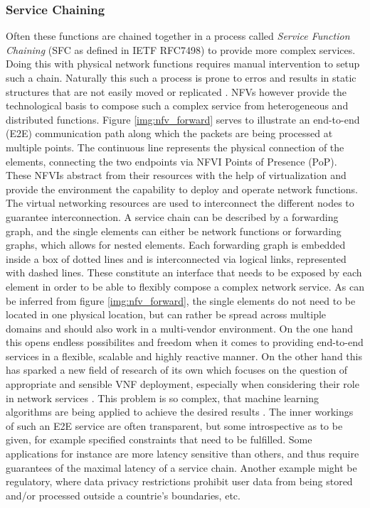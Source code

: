 \subsubsection{Service Chaining}
Often these functions are chained together in a process called \textit{Service Function Chaining} (SFC as defined in IETF RFC7498) to provide more complex services. Doing this with physical network functions requires manual intervention to setup such a chain. Naturally this such a process is prone to erros and results in static structures that are not easily moved or replicated \cite{luizelli2017actual}. NFVs  however provide the technological basis to compose such a complex service from heterogeneous and distributed functions. Figure \ref{img:nfv_forward} serves to illustrate an end-to-end (E2E) communication path along which the packets are being processed at multiple points. The continuous line represents the physical connection of the elements, connecting the two endpoints via NFVI Points of Presence (PoP). These NFVIs abstract from their resources with the help of virtualization and provide the environment the capability to deploy and operate network functions. The virtual networking resources are used to interconnect the different nodes to guarantee interconnection.  A service chain can be described by a forwarding graph, and the single elements can either be network functions or forwarding graphs, which allows for nested elements. Each forwarding graph is embedded inside a box of dotted lines and is interconnected via logical links, represented with dashed lines. These constitute an interface that needs to be exposed by each element in order to be able to flexibly compose a complex network service. As can be inferred from figure \ref{img:nfv_forward}, the single elements do not need to be located in one physical location, but can rather be spread across multiple domains and should also work in a multi-vendor environment. On the one hand this opens endless possibilites and freedom when it comes to providing end-to-end services in a flexible, scalable and highly reactive manner. On the other hand this has sparked a new field of research of its own which focuses on the question of appropriate and sensible VNF deployment, especially when considering their role in network services \cite{place1} \cite{place2} \cite{place3}. This problem is so complex, that machine learning algorithms are being applied to achieve the desired results \cite{placeml1} \cite{placeml2}.  The inner workings of such an E2E service are often transparent, but some introspective as to be given, for example specified constraints that need to be fulfilled. Some applications for instance are more latency sensitive than others, and thus require guarantees of the maximal latency of a service chain. Another example might be regulatory, where data privacy restrictions prohibit user data from being stored and/or processed outside a countrie's boundaries, etc. 

